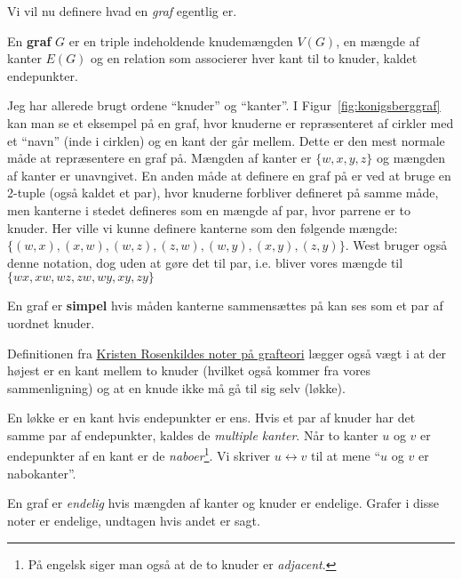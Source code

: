 Vi vil nu definere hvad en \textit{graf} egentlig er.

\begin{definition}[Graf]
	En \textbf{graf} $G$ er en triple indeholdende knudemængden $V(G)$, en mængde af kanter $E(G)$ og en relation som associerer hver kant til to knuder, kaldet endepunkter.
\end{definition}

Jeg har allerede brugt ordene ``knuder'' og ``kanter''. I Figur~\ref{fig:konigsberggraf} kan man se et eksempel på en graf, hvor knuderne er repræsenteret af cirkler med et ``navn'' (inde i cirklen) og en kant der går mellem. Dette er den mest normale måde at repræsentere en graf på. Mængden af kanter er $\{w,x,y,z\}$ og mængden af kanter er unavngivet. En anden måde at definere en graf på er ved at bruge en 2-tuple (også kaldet et par), hvor knuderne forbliver defineret på samme måde, men kanterne i stedet defineres som en mængde af par, hvor parrene er to knuder. Her ville vi kunne definere kanterne som den følgende mængde: $\{(w,x), (x,w), (w,z), (z,w), (w,y), (x,y), (z,y)\}$. West bruger også denne notation, dog uden at gøre det til par, i.e. bliver vores mængde til $\{wx, xw, wz, zw, wy, xy, zy\}$

\begin{definition}
	En graf er \textbf{simpel} hvis måden kanterne sammensættes på kan ses som et par af uordnet knuder.
\end{definition}

Definitionen fra \href{https://www.georgmohr.dk/noter/grafteori2014.pdf}{Kristen Rosenkildes noter på grafteori} lægger også vægt i at der højest er en kant mellem to knuder (hvilket også kommer fra vores sammenligning) og at en knude ikke må gå til sig selv (løkke).

\begin{definition}[Løkke]
	En løkke er en kant hvis endepunkter er ens. Hvis et par af knuder har det samme par af endepunkter, kaldes de \textit{multiple kanter}. Når to kanter $u$ og $v$ er endepunkter af en kant er de \textit{naboer}\footnote{På engelsk siger man også at de to knuder er \textit{adjacent}.}. Vi skriver $u \leftrightarrow v$ til at mene ``$u$ og $v$ er nabokanter''.
\end{definition}

En graf er \textit{endelig} hvis mængden af kanter og knuder er endelige. Grafer i disse noter er endelige, undtagen hvis andet er sagt.

